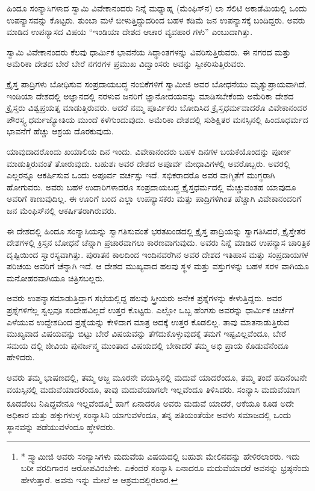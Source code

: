 ಹಿಂದೂ ಸಂನ್ಯಾಸಿಗಳಾದ ಸ್ವಾಮಿ ವಿವೇಕಾನಂದರು ನಿನ್ನೆ ಮಧ್ಯಾಹ್ನ (ಮೆಂಫಿಸ್​ನ) ಲಾ ಸೆಲಿಟಿ ಅಕಾಡೆಮಿಯಲ್ಲಿ ಒಂದು ಉಪನ್ಯಾಸವನ್ನು ಕೊಟ್ಟರು. ತುಂಬಾ ಮಳೆ ಬೀಳುತ್ತಿದ್ದುದರಿಂದ ಬಹಳ ಕಡಿಮೆ ಜನ ಉಪನ್ಯಾಸಕ್ಕೆ ಬಂದಿದ್ದರು. ಅವರು ಮಾಡಿದ ಉಪನ್ಯಾಸದ ವಿಷಯ “ಇಂಡಿಯಾ ದೇಶದ ಆಚಾರ ವ್ಯವಹಾರ ಗಳು” ಎಂಬುದಾಗಿತ್ತು.

ಸ್ವಾಮಿ ವಿವೇಕಾನಂದರು ಕೆಲವು ಧಾರ್ಮಿಕ ಭಾವನೆಯ ಸಿದ್ಧಾಂತಗಳನ್ನು ವಿವರಿಸುತ್ತಿರುವರು. ಈ ನಗರದ ಮತ್ತು ಅಮೆರಿಕಾ ದೇಶದ ಬೇರೆ ಬೇರೆ ನಗರಗಳ ಪ್ರಮುಖ ವಿದ್ವಾಂಸರು ಅವನ್ನು ಸ್ವೀಕರಿಸುತ್ತಿರುವರು.

ಕ್ರೈಸ್ತ ಪಾದ್ರಿಗಳು ಬೋಧಿಸುವ ಸಂಪ್ರದಾಯಬದ್ಧ ನಂಬಿಕೆಗಳಿಗೆ ಸ್ವಾಮೀಜಿ ಅವರ ಬೋಧನೆಯು ಮೃತ್ಯುಪ್ರಾಯವಾಗಿದೆ. ಇಂಡಿಯಾ ದೇಶದಲ್ಲಿ ಅಜ್ಞಾನದಲ್ಲಿ ನರಳುವ ಜನರಿಗೆ ಜ್ಞಾನೋದಯವನ್ನು ಮಾಡಿಸಬೇಕೆಂದು ಅಮೆರಿಕಾ ದೇಶದ ಕ್ರೈಸ್ತರು ವಿಶ್ವಪ್ರಯತ್ನ ಮಾಡುತ್ತಿರುವರು. ಆದರೆ ನಮ್ಮ ಪೂರ್ವಿಕರು ಬೋದಿಸಿದ ಕ್ರೈಸ್ತಧರ್ಮವಾದರೊ ವಿವೇಕಾನಂದರ ಪೌರಸ್ತ್ಯ ಧರ್ಮಜ್ಯೋತಿಯ ಮುಂದೆ ಕಳೆಗುಂದುವುದು. ಅಮೆರಿಕಾ ದೇಶದಲ್ಲಿ ಸುಶಿಕ್ಷಿತರ ಮನಸ್ಸಿನಲ್ಲಿ ಹಿಂದೂಧರ್ಮದ ಭಾವನೆಗೆ ಹೆಚ್ಚು ಆಶ್ರಯ ದೊರಕುವುದು.

ಯಾವುದಾದರೊಂದು ಖಯಾಲಿಯ ದಿನ ಇಂದು. ವಿವೇಕಾನಂದರು ಬಹಳ ದಿನಗಳ ಬಯಕೆಯೊಂದನ್ನು ಪೂರ್ಣ ಮಾಡುತ್ತಿರುವಂತೆ ತೋರುವುದು. ಬಹುಶಃ ಅವರ ದೇಶದ ಅಪೂರ್ವ ಮೇಧಾವಿಗಳಲ್ಲಿ ಅವರೊಬ್ಬರು. ಅವರಲ್ಲಿ ಎಲ್ಲರನ್ನೂ ಆಕರ್ಷಿಸುವ ಒಂದು ಅಪೂರ್ವ ವರ್ಚಸ್ಸು ಇದೆ. ಸಭಿಕರಾದರೊ ಅವರ ವಾಗ್ಮಿತೆಗೆ ಮುಗ್ಧರಾಗಿ ಹೋಗುವರು. ಅವರು ಬಹಳ ಉದಾರಿಗಳಾದರೂ ಸಂಪ್ರದಾಯಬದ್ಧ ಕ್ರೈಸ್ತಧರ್ಮದಲ್ಲಿ ಮೆಚ್ಚುವಂತಹ ಯಾವುದೂ ಅವರಿಗೆ ಕಾಣುವುದಿಲ್ಲ. ಈ ಊರಿಗೆ ಬಂದ ಎಲ್ಲಾ ಉಪನ್ಯಾಸಕರು ಮತ್ತು ಪಾದ್ರಿಗಳಿಗಿಂತ ಹೆಚ್ಚಾಗಿ ವಿವೇಕಾನಂದರಿಗೆ ಜನ ಮೆಂಫಿಸ್​ನಲ್ಲಿ ಆಕರ್ಷಿತರಾಗಿರುವರು.

ಈ ದೇಶದಲ್ಲಿ ಹಿಂದೂ ಸಂನ್ಯಾಸಿಯನ್ನು ಸ್ವಾಗತಿಸುವಂತೆ ಭರತಖಂಡದಲ್ಲಿ ಕ್ರೈಸ್ತ ಪಾದ್ರಿಯನ್ನು ಸ್ವಾಗತಿಸಿದರೆ, ಕ್ರೈಸ್ತೇತರ ದೇಶಗಳಲ್ಲಿ ಕ್ರಿಸ್ತನ ಬೋಧನೆ ಚೆನ್ನಾಗಿ ಪ್ರಚಾರವಾಗಲು ಕಾರಣವಾಗುವುದು. ಅವರು ನಿನ್ನೆ ಮಾಡಿದ ಉಪನ್ಯಾಸ ಚಾರಿತ್ರಿಕ ದೃಷ್ಟಿಯಿಂದ ಸ್ವಾರಸ್ಯವಾಗಿತ್ತು. ಪುರಾತನ ಕಾಲದಿಂದ ಇಂದಿನವರೆಗಿನ ಅವರ ದೇಶದ ಇತಿಹಾಸ ಮತ್ತು ಸಂಪ್ರದಾಯಗಳ ಪರಿಚಯ ಅವರಿಗೆ ಚೆನ್ನಾಗಿ ಇದೆ. ಆ ದೇಶದ ಮುಖ್ಯವಾದ ಹಲವು ಸ್ಥಳ ಮತ್ತು ವಸ್ತುಗಳನ್ನು ಬಹಳ ಸರಳ ವಾಗಿಯೂ ಮನೋಹರವಾಗಿಯೂ ಚಿತ್ರಿಸಬಲ್ಲರು.

ಅವರು ಉಪನ್ಯಾಸಮಾಡುತ್ತಿದ್ದಾಗ ಸಭೆಯಲ್ಲಿದ್ದ ಹಲವು ಸ್ತ್ರೀಯರು ಅನೇಕ ಪ್ರಶ್ನೆಗಳನ್ನು ಕೇಳುತ್ತಿದ್ದರು. ಅವರ ಪ್ರಶ್ನೆಗಳಿಗೆಲ್ಲ ಸ್ವಲ್ಪವೂ ಸಂದೇಹವಿಲ್ಲದೆ ಉತ್ತರ ಕೊಟ್ಟರು. ಎಲ್ಲೋ ಒಬ್ಬ ಹೆಂಗಸು ಅವರನ್ನು ಧಾರ್ಮಿಕ ಚರ್ಚೆಗೆ ಎಳೆಯುವ ಉದ್ದೇಶದಿಂದ ಪ್ರಶ್ನೆಯನ್ನು ಕೇಳಿದಾಗ ಮಾತ್ರ ಅದಕ್ಕೆ ಉತ್ತರ ಕೊಡಲಿಲ್ಲ. ತಾವು ಮಾತನಾಡುತ್ತಿರುವ ಮುಖ್ಯವಾದ ವಿಷಯವನ್ನು ಬಿಟ್ಟು ಬೇರೆ ವಿಷಯವನ್ನು ತೆಗೆದುಕೊಳ್ಳುವುದಕ್ಕೆ ತಮಗೆ ಇಷ್ಟವಿಲ್ಲವೆಂದೂ, ಬೇರೆ ಸಮಯ ದಲ್ಲಿ ಜೀವಿಯ ಪುನರ್ಜನ್ಮ ಮುಂತಾದ ವಿಷಯದಲ್ಲಿ ಬೇಕಾದರೆ ತಮ್ಮ ಅಭಿ ಪ್ರಾಯ ಕೊಡುವೆನೆಂದೂ ಹೇಳಿದರು.

ಅವರು ತಮ್ಮ ಭಾಷಣದಲ್ಲಿ, ತಮ್ಮ ಅಜ್ಜ ಮೂರನೇ ವಯಸ್ಸಿನಲ್ಲಿ ಮದುವೆ ಯಾದರೆಂದೂ, ತಮ್ಮ ತಂದೆ ಹದಿನೆಂಟನೇ ವಯಸ್ಸಿನಲ್ಲಿ ಮದುವೆಯಾದರೆಂದೂ, ತಾವು ಮದುವೆಯಾಗಲೇ ಇಲ್ಲವೆಂದೂ ತಿಳಿಸಿದರು. ಸಂನ್ಯಾಸಿ ಮದುವೆಯಾಗ ಕೂಡದೆಂಬ ನಿಷಿದ್ಧವೇನೂ ಇಲ್ಲವೆಂದೂ\footnote{* ಸ್ಸ್ವಾಮೀಜಿ ಅವರು ಸಂನ್ಯಾಸಿಗಳು ಮದುವೆಯ ವಿಷಯದಲ್ಲಿ ಬಹುಶಃ ಮೇಲಿನದನ್ನು ಹೇಳಿರಲಾರರು. ಇದು ಬರೀ ವರದಿಗಾರನ ಆರೋಪವಿರಬೇಕು. ಏಕೆಂದರೆ ಸಂನ್ಯಾಸಿ ಏನಾದರೂ ಮದುವೆಯಾದರೆ ಅವನನ್ನು ಭ್ರಷ್ಠನೆಂದು ಹೇಳುತ್ತಾರೆ. ಅವನು ಇನ್ನು ಮೇಲೆ ಆ ಆಶ್ರಮದಲ್ಲಿರಲಾರ.} ಹಾಗೆ ಏನಾದರೂ ಅವರು ಮದುವೆ ಯಾದರೆ, ಆಕೆಯೂ ಕೂಡ ಅದೇ ಅಧಿಕಾರ ಮತ್ತು ಹಕ್ಕುಗಳುಳ್ಳ ಸಂನ್ಯಾಸಿನಿ ಯಾಗುವಳೆಂದೂ, ತನ್ನ ಪತಿಯಂತೆಯೇ ಅವಳು ಸಮಾಜದಲ್ಲಿ ಒಂದು ಸ್ಥಾನವನ್ನು ಪಡೆಯುವಳೆಂದೂ ಹ್ಧೇಳಿದರು.


